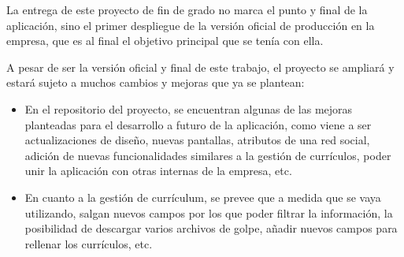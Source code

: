 La entrega de este proyecto de fin de grado no marca el punto y final de la aplicación, sino el primer despliegue de la versión oficial de producción en la empresa, que es al final el objetivo principal que se tenía con ella.

A pesar de ser la versión oficial y final de este trabajo, el proyecto se ampliará y estará sujeto a muchos cambios y mejoras que ya se plantean:

\begin{itemize}
\item  En el repositorio del proyecto, se encuentran algunas de las mejoras planteadas para el        desarrollo a futuro de la aplicación, como viene a ser actualizaciones de diseño, nuevas 
  pantallas, atributos de una red social, adición de nuevas funcionalidades similares a la gestión de currículos, poder unir la aplicación con otras internas de la empresa, etc.
\item
  En cuanto a la gestión de currículum, se prevee que a medida que se vaya utilizando, salgan nuevos campos por los que poder filtrar la información, la posibilidad de descargar varios archivos de golpe, añadir nuevos campos para rellenar los currículos, etc.
\end{itemize}
